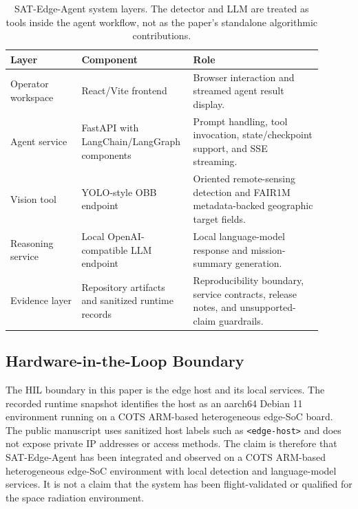 \documentclass[10pt,letterpaper]{article}
\begin{document}
\begin{table}[htbp]
\centering
\renewcommand{\arraystretch}{1.16}
\setlength{\tabcolsep}{4pt}
\caption{SAT-Edge-Agent system layers. The detector and LLM are treated as tools inside the agent workflow, not as the paper's standalone algorithmic contributions.}
\label{tab:system_layers}
\begin{tabular}{p{0.22\linewidth}p{0.28\linewidth}p{0.40\linewidth}}
\toprule
\rowcolor{gray!12}
\textbf{Layer} & \textbf{Component} & \textbf{Role} \\
\midrule
Operator workspace & React/Vite frontend & Browser interaction and streamed agent result display. \\
\rowcolor{graybg}
Agent service & FastAPI with LangChain/LangGraph components & Prompt handling, tool invocation, state/checkpoint support, and SSE streaming. \\
Vision tool & YOLO-style OBB endpoint & Oriented remote-sensing detection and FAIR1M metadata-backed geographic target fields. \\
\rowcolor{graybg}
Reasoning service & Local OpenAI-compatible LLM endpoint & Local language-model response and mission-summary generation. \\
Evidence layer & Repository artifacts and sanitized runtime records & Reproducibility boundary, service contracts, release notes, and unsupported-claim guardrails. \\
\bottomrule
\end{tabular}
\end{table}



\subsection{Hardware-in-the-Loop Boundary}

The HIL boundary in this paper is the edge host and its local services. The recorded runtime snapshot identifies the host as an aarch64 Debian 11 environment running on a COTS ARM-based heterogeneous edge-SoC board. The public manuscript uses sanitized host labels such as \texttt{<edge-host>} and does not expose private IP addresses or access methods. The claim is therefore that SAT-Edge-Agent has been integrated and observed on a COTS ARM-based heterogeneous edge-SoC environment with local detection and language-model services. It is not a claim that the system has been flight-validated or qualified for the space radiation environment.
\end{document}
